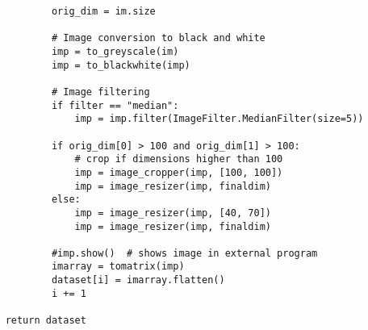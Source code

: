 \documentclass[letterpaper,twocolumn,10pt]{article}
\begin{document}
\begin{lstlisting}
            orig_dim = im.size

            # Image conversion to black and white
            imp = to_greyscale(im)
            imp = to_blackwhite(imp)

            # Image filtering
            if filter == "median":
                imp = imp.filter(ImageFilter.MedianFilter(size=5))

            if orig_dim[0] > 100 and orig_dim[1] > 100:
                # crop if dimensions higher than 100
                imp = image_cropper(imp, [100, 100])
                imp = image_resizer(imp, finaldim)
            else:
                imp = image_resizer(imp, [40, 70])
                imp = image_resizer(imp, finaldim)

            #imp.show()  # shows image in external program
            imarray = tomatrix(imp)
            dataset[i] = imarray.flatten()
            i += 1

    return dataset
\end{lstlisting}

\clearpage
\end{document}
